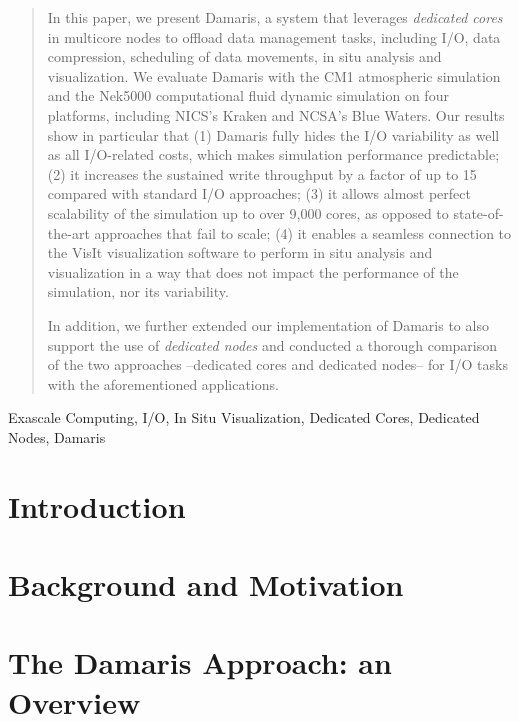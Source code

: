 \documentclass[preprint]{elsarticle}
\begin{document}
\begin{frontmatter}
\begin{abstract}
In this paper, we present Damaris, a system that leverages \emph{dedicated cores}
in multicore nodes to offload data management tasks, including I/O, data compression,
scheduling of data movements, in situ analysis and visualization. We evaluate Damaris
with the CM1 atmospheric simulation and the Nek5000 computational fluid dynamic simulation 
on four platforms, including NICS's Kraken and NCSA's Blue Waters.
Our results show in particular that 
(1) Damaris fully hides the I/O variability as well as all I/O-related costs, which 
makes simulation performance predictable; 
(2) it increases the sustained write throughput by a factor of up to 15 compared with standard I/O approaches; 
(3) it allows almost perfect scalability of the simulation up to over 9,000 cores, as opposed to state-of-the-art 
approaches that fail to scale;
(4) it enables a seamless connection to the VisIt visualization software to perform in situ analysis and visualization
in a way that does not impact the performance of the simulation, nor its variability.

In addition, we further extended our implementation of Damaris to also support the use of \emph{dedicated
nodes} and conducted a thorough comparison of the two approaches --dedicated cores and dedicated nodes--
for I/O tasks with the aforementioned applications.
\end{abstract}

\begin{keyword}
Exascale Computing, I/O, In Situ Visualization, Dedicated Cores, Dedicated Nodes, Damaris
\end{keyword}

\end{frontmatter}



\section{Introduction}
\label{sec:introduction}


\section{Background and Motivation}
\label{sec:background}


\section{The Damaris Approach: an Overview}
\label{sec:damaris}

\end{document}
